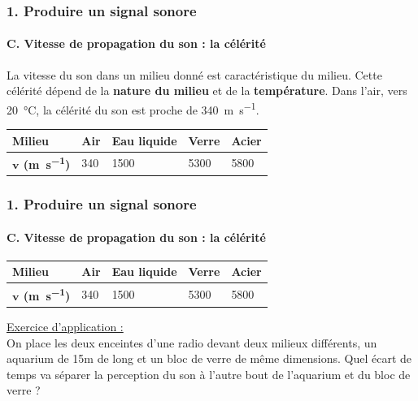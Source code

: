 \documentclass{beamer}
\begin{document}
\begin{frame}
	\frametitle{1. Produire un signal sonore}
	\framesubtitle{C. Vitesse de propagation du son : la célérité}
	La vitesse du son dans un milieu donné est caractéristique du milieu. Cette célérité dépend de la \textbf{nature du milieu} et de la \textbf{température}. Dans l'air, vers \SI{20}{\celsius}, la célérité du son est proche de \SI{340}{\meter\per\second}.
	\\
	
	\begin{tabular}{|>{\centering}m{2cm}|>{\centering}m{1cm}|>{\centering}m{2cm}|>{\centering}m{2cm}|>{\centering\arraybackslash}m{2cm}|}
		\hline \textbf{Milieu}& Air & Eau liquide & Verre & Acier\\
		\hline \textbf{$\mathbf{v}$ (\unit{\meter\per\second})} & \num{340} & \num{1500} &\num{5300}&\num{5800}\\
		\hline
	\end{tabular}
\end{frame}

\begin{frame}
	\frametitle{1. Produire un signal sonore}
	\framesubtitle{C. Vitesse de propagation du son : la célérité}
	\begin{small}
		\begin{tabular}{|>{\centering}m{2cm}|>{\centering}m{1cm}|>{\centering}m{2cm}|>{\centering}m{2cm}|>{\centering\arraybackslash}m{2cm}|}
			\hline \textbf{Milieu}& Air & Eau liquide & Verre & Acier\\
			\hline \textbf{$\mathbf{v}$ (\unit{\meter\per\second})} & \num{340} & \num{1500} &\num{5300}&\num{5800}\\
			\hline
		\end{tabular}
	\end{small}	
\vspace{1cm}

\underline{Exercice d'application :}\\
On place les deux enceintes d’une radio devant deux milieux différents, un aquarium
de 15m de long et un bloc de verre de même dimensions. Quel écart de temps va
séparer la perception du son à l’autre bout de l’aquarium et du bloc de verre ?
	
\end{frame}
\end{document}

